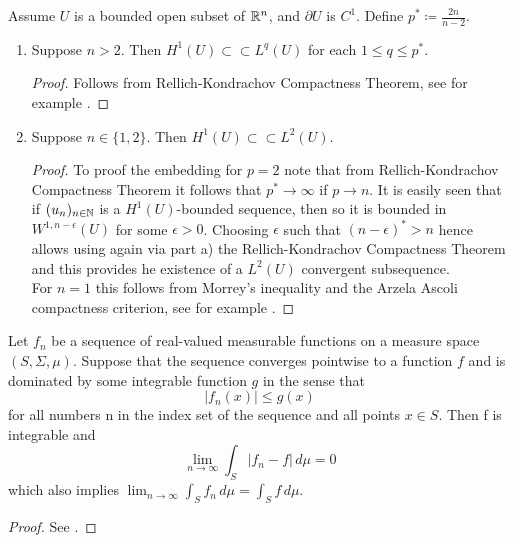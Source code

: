 \begin{atheorem} \label{compact-embedding-theorem} %
	Assume $U$ is a bounded open subset of $\mathbb{R}^{n}$, and $\partial U$ is $C^{1}$. Define $p^{*} \coloneqq \frac{2 n}{n - 2}$.
	\begin{enumerate}[label=\alph*\upshape)]
		\item Suppose $n > 2$. Then $H^{1}(U) \subset\subset L^{q}(U)$ for each $1 \leq q \leq p^{*}$.
		
			\begin{proof}
				Follows from Rellich-Kondrachov Compactness Theorem, see for example \cite[p. 272]{evans1998partial}.
			\end{proof}
		\item Suppose $n \in \{1, 2\}$. Then $H^{1}(U) \subset\subset L^{2}(U)$.
			\begin{proof} To proof the embedding for $p=2$ note that from Rellich-Kondrachov Compactness Theorem it follows that $p^{*} \rightarrow \infty$ if $p \rightarrow n$. It is easily seen that if $(u_{n})_{n \in \mathbb{N}}$ is a $H^{1}(U)$-bounded sequence, then so it is bounded in $W^{1, n-\epsilon}(U)$ for some $\epsilon > 0$. Choosing $\epsilon$ such that $(n - \epsilon)^{*} > n$ hence allows using again via part a) the Rellich-Kondrachov Compactness Theorem and  this provides he existence of a $L^{2}(U)$ convergent subsequence. ~\\
			For $n = 1$ this follows from Morrey's inequality and the Arzela Ascoli compactness criterion, see for example \cite[p. 274]{evans1998partial}.
			\end{proof}
	\end{enumerate}
\end{atheorem}

\begin{atheorem}
	Let ${f_n}$ be a sequence of real-valued measurable functions on a measure space $(S, \Sigma, \mu)$. Suppose that the sequence converges pointwise to a function $f$ and is dominated by some integrable function $g$ in the sense that
		\[ |f_n(x)| \le g(x) \]
	for all numbers n in the index set of the sequence and all points $x \in S$. Then f is integrable and
		\[ \lim_{n\to\infty} \int_S |f_n-f|\,d\mu = 0 \]
	which also implies $\lim_{n\to\infty} \int_S f_n\,d\mu = \int_S f\,d\mu$.

	\begin{proof}
		See \cite[p. 516]{werner2006funkana}.
	\end{proof}
\end{atheorem}

